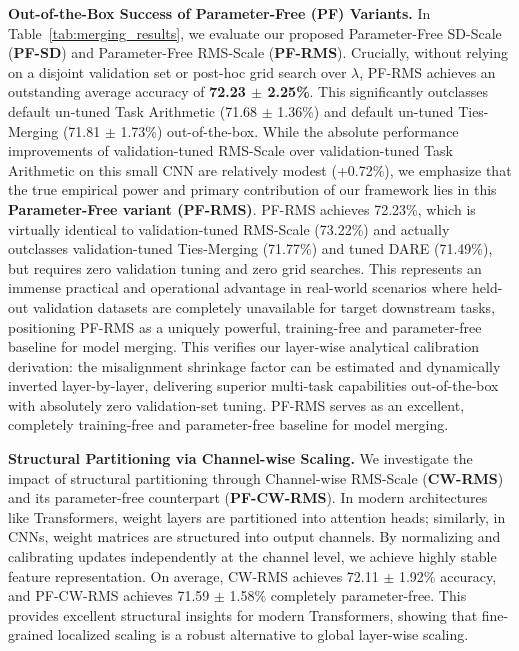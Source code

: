 \textbf{Out-of-the-Box Success of Parameter-Free (PF) Variants.}
In Table~\ref{tab:merging_results}, we evaluate our proposed Parameter-Free SD-Scale (\textbf{PF-SD}) and Parameter-Free RMS-Scale (\textbf{PF-RMS}). Crucially, without relying on a disjoint validation set or post-hoc grid search over $\lambda$, PF-RMS achieves an outstanding average accuracy of \textbf{72.23 $\pm$ 2.25\%}. This significantly outclasses default un-tuned Task Arithmetic (71.68 $\pm$ 1.36\%) and default un-tuned Ties-Merging (71.81 $\pm$ 1.73\%) out-of-the-box. While the absolute performance improvements of validation-tuned RMS-Scale over validation-tuned Task Arithmetic on this small CNN are relatively modest (+0.72\%), we emphasize that the true empirical power and primary contribution of our framework lies in this \textbf{Parameter-Free variant (PF-RMS)}. PF-RMS achieves 72.23\%, which is virtually identical to validation-tuned RMS-Scale (73.22\%) and actually outclasses validation-tuned Ties-Merging (71.77\%) and tuned DARE (71.49\%), but requires zero validation tuning and zero grid searches. This represents an immense practical and operational advantage in real-world scenarios where held-out validation datasets are completely unavailable for target downstream tasks, positioning PF-RMS as a uniquely powerful, training-free and parameter-free baseline for model merging. This verifies our layer-wise analytical calibration derivation: the misalignment shrinkage factor can be estimated and dynamically inverted layer-by-layer, delivering superior multi-task capabilities out-of-the-box with absolutely zero validation-set tuning. PF-RMS serves as an excellent, completely training-free and parameter-free baseline for model merging.

\textbf{Structural Partitioning via Channel-wise Scaling.}
We investigate the impact of structural partitioning through Channel-wise RMS-Scale (\textbf{CW-RMS}) and its parameter-free counterpart (\textbf{PF-CW-RMS}). In modern architectures like Transformers, weight layers are partitioned into attention heads; similarly, in CNNs, weight matrices are structured into output channels. By normalizing and calibrating updates independently at the channel level, we achieve highly stable feature representation. On average, CW-RMS achieves 72.11 $\pm$ 1.92\% accuracy, and PF-CW-RMS achieves 71.59 $\pm$ 1.58\% completely parameter-free. This provides excellent structural insights for modern Transformers, showing that fine-grained localized scaling is a robust alternative to global layer-wise scaling.

